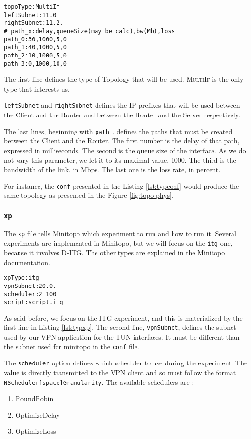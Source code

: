 \begin{lstlisting}[label=lst:typconf,caption=Typical configuration file]
topoType:MultiIf
leftSubnet:11.0.
rightSubnet:11.2.
# path_x:delay,queueSize(may be calc),bw(Mb),loss
path_0:30,1000,5,0
path_1:40,1000,5,0
path_2:10,1000,5,0
path_3:0,1000,10,0
\end{lstlisting}

The first line defines the type of Topology that will be used. \textsc{MultiIf} is the only type that interests us.

\texttt{leftSubnet} and \texttt{rightSubnet} defines the IP prefixes that will be used between the Client and the Router and between the Router and the Server respectively.

The last lines, beginning with \texttt{path\_}, defines the paths that must be created between the Client and the Router. The first number is the delay of that path, expressed in milliseconds. The second is the queue size of the interface. As we do not vary this parameter, we let it to its maximal value, 1000. The third is the bandwidth of the link, in Mbps. The last one is the loss rate, in percent.

For instance, the \texttt{conf} presented in the Listing \ref{lst:typconf} would produce the same topology as presented in the Figure \ref{fig:topo-phys}.

\subsubsection{\texttt{xp}}

The \texttt{xp} file tells Minitopo which experiment to run and how to run it. Several experiments are implemented in Minitopo, but we will focus on the \texttt{itg} one, because it involves D-ITG. The other types are explained in the Minitopo documentation\cite{minitopo}.

\begin{lstlisting}[label=lst:typxp,caption=Typical experience file]
xpType:itg
vpnSubnet:20.0.
scheduler:2 100
script:script.itg
\end{lstlisting}

As said before, we focus on the ITG experiment, and this is materialized by the first line in Listing \ref{lst:typxp}. The second line, \texttt{vpnSubnet}, defines the subnet used by our VPN application for the TUN interfaces. It must be different than the subnet used for minitopo in the \texttt{conf} file.

The \texttt{scheduler} option defines which scheduler to use during the experiment. The value is directly transmitted to the VPN client and so must follow the format \texttt{N\degree Scheduler[space]Granularity}. The available schedulers are :
\begin{enumerate}
\item RoundRobin
\item OptimizeDelay
\item OptimizeLoss
\end{enumerate}

